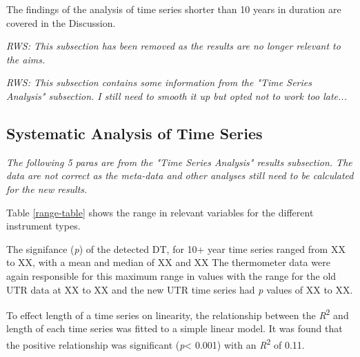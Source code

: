\documentclass{ametsoc}
\begin{document}
The findings of the analysis of time series shorter than 10 years in duration are covered in the Discussion.

\emph{RWS: This subsection has been removed as the results are no longer relevant to the aims.}

\emph{RWS: This subsection contains some information from the "Time Series Analysis" subsection. I still need to smooth it up but opted not to work too late...}
\subsection{Systematic Analysis of Time Series}

\emph{The following 5 paras are from the "Time Series Analysis" results subsection. The data are not correct as the meta-data and other analyses still need to be calculated for the new results.}

Table \ref{range-table} shows the range in relevant variables for the different instrument types.

The signifance (\emph{p}) of the detected DT, for 10+ year time series ranged from XX to XX, with a mean and median of XX and XX The thermometer data were again responsible for this maximum range in values with the range for the old UTR data at XX to XX and the new UTR time series had  \emph{p} values of XX to XX.

To effect length of a time series on linearity, the relationship between the \emph{R}\textsuperscript{2} and length of each time series was fitted to a simple linear model. It was found that the positive relationship was significant (\emph{p}\num{< 0.001}) with an \emph{R}\textsuperscript{2} of 0.11.
\end{document}
